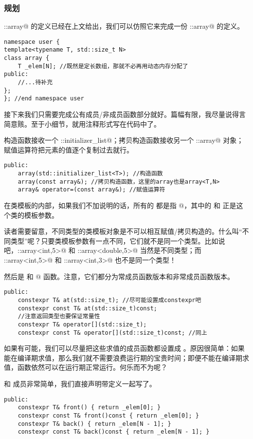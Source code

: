 \subsubsection*{规划}
\lstinline@std::array@ 的定义已经在上文给出，我们可以仿照它来完成一份 \lstinline@user::array@ 的定义。
\begin{lstlisting}
namespace user {
template<typename T, std::size_t N>
class array {
    T _elem[N]; //既然是定长数组，那就不必再用动态内存分配了
public:
    //...待补充
};
}; //end namespace user
\end{lstlisting}
接下来我们只需要完成公有成员/非成员函数部分就好。篇幅有限，我尽量说得言简意赅。至于小细节，就用注释形式写在代码中了。\par
构造函数接收一个 \lstinline@std::initializer_list@；拷贝构造函数接收另一个 \lstinline@user::array@ 对象；赋值运算符把元素的值逐个复制过去就行。
\begin{lstlisting}
public:
    array(std::initializer_list<T>); //构造函数
    array(const array&); //拷贝构造函数，这里的array也是array<T,N>
    array& operator=(const array&); //赋值运算符
\end{lstlisting}
在类模板的内部，如果我们不加说明的话，所有的 \lstinline@array@ 都是指 @，其中的 \lstinline@T@ 和 \lstinline@N@ 正是这个类的模板参数。\par
读者需要留意，不同类型的类模板对象是不可以相互赋值/拷贝构造的。什么叫``不同类型''呢？只要类模板参数有一点不同，它们就不是同一个类型。比如说吧，\lstinline@user::array<int,5>@ 和 \lstinline@user::array<double,5>@ 当然是不同类型；而 \lstinline@user::array<int,5>@ 和 \lstinline@user::array<int,3>@ 也不是同一个类型！\par
然后是 \lstinline@at@ 和 \lstinline@operator[]@ 函数。注意，它们都分为常成员函数版本和非常成员函数版本。
\begin{lstlisting}
public:
    constexpr T& at(std::size_t); //尽可能设置成constexpr吧
    constexpr const T& at(std::size_t)const;
    //注意返回类型也要保证常量性
    constexpr T& operator[](std::size_t);
    constexpr const T& operator[](std::size_t)const; //同上
\end{lstlisting}
如果有可能，我们可以尽量把这些求值的成员函数都设置成 \lstinline@constexpr@。原因很简单：如果能在编译期求值，那么我们就不需要浪费运行期的宝贵时间；即便不能在编译期求值，\lstinline@constexpr@ 函数依然可以在运行期正常运行。何乐而不为呢？\par
\lstinline@front@ 和 \lstinline@back@ 成员非常简单，我们直接声明带定义一起写了。
\begin{lstlisting}
public:
    constexpr T& front() { return _elem[0]; }
    constexpr const T& front()const { return _elem[0]; }
    constexpr T& back() { return _elem[N - 1]; }
    constexpr const T& back()const { return _elem[N - 1]; }
\end{lstlisting}\par
